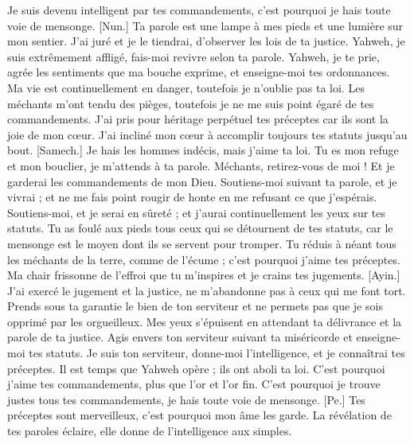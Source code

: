 \begin{multicols}{2}
Je suis devenu intelligent par tes commandements, c'est pourquoi je hais toute voie de mensonge.
[Nun.] Ta parole est une lampe à mes pieds et une lumière sur mon sentier.
J'ai juré et je le tiendrai, d'observer les lois de ta justice.
Yahweh, je suis extrêmement affligé, fais-moi revivre selon ta parole.
Yahweh, je te prie, agrée les sentiments que ma bouche exprime, et enseigne-moi tes ordonnances.
Ma vie est continuellement en danger, toutefois je n'oublie pas ta loi.
Les méchants m'ont tendu des pièges, toutefois je ne me suis point égaré de tes commandements.
J'ai pris pour héritage perpétuel tes préceptes car ils sont la joie de mon cœur.
J'ai incliné mon cœur à accomplir toujours tes statuts jusqu'au bout.
[Samech.] Je hais les hommes indécis, mais j'aime ta loi.
Tu es mon refuge et mon bouclier, je m'attends à ta parole.
Méchants, retirez-vous de moi ! Et je garderai les commandements de mon Dieu.
Soutiens-moi suivant ta parole, et je vivrai ; et ne me fais point rougir de honte en me refusant ce que j'espérais.
Soutiens-moi, et je serai en sûreté ; et j'aurai continuellement les yeux sur tes statuts.
Tu as foulé aux pieds tous ceux qui se détournent de tes statuts, car le mensonge est le moyen dont ils se servent pour tromper.
Tu réduis à néant tous les méchants de la terre, comme de l'écume ; c'est pourquoi j'aime tes préceptes.
Ma chair frissonne de l'effroi que tu m'inspires et je crains tes jugements.
[Ayin.] J'ai exercé le jugement et la justice, ne m'abandonne pas à ceux qui me font tort.
Prends sous ta garantie le bien de ton serviteur et ne permets pas que je sois opprimé par les orgueilleux.
Mes yeux s'épuisent en attendant ta délivrance et la parole de ta justice.
Agis envers ton serviteur suivant ta miséricorde et enseigne-moi tes statuts.
Je suis ton serviteur, donne-moi l'intelligence, et je connaîtrai tes préceptes.
Il est temps que Yahweh opère ; ils ont aboli ta loi.
C'est pourquoi j'aime tes commandements, plus que l'or et l'or fin.
C'est pourquoi je trouve justes tous tes commandements, je hais toute voie de mensonge.
[Pe.] Tes préceptes sont merveilleux, c'est pourquoi mon âme les garde.
La révélation de tes paroles éclaire, elle donne de l'intelligence aux simples.

\end{multicols}

